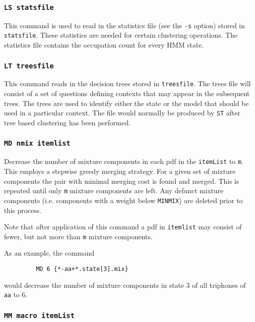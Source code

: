 \subsubsection*{\tt LS statsfile}

This command is used to read in the  statistics file 
(see the  \texttt{-s} option) stored in \texttt{statsfile}.  These
statistics are needed for certain clustering operations.
The statistics file contains the occupation count for every HMM state. 

\subsubsection*{\tt LT treesfile}

This command reads in the decision trees stored in \texttt{treesfile}.
The trees file will consist of a set of questions defining contexts
that may appear in the subsequent trees.  The trees are used to
identify either the state or the model that should be used in
a particular context.  The file would normally be produced by
\texttt{ST} after tree based clustering has been performed.

\subsubsection*{\tt MD nmix itemlist}

Decrease the number of mixture components in each pdf in the
\texttt{itemList} to \texttt{m}. This employs a stepwise greedy
merging strategy. For a given set of mixture components the pair with
minimal merging cost is found and merged. This is repeated until only
\texttt{m} mixture components are left. Any defunct mixture components
(i.e. components with a weight below \texttt{MINMIX}) are deleted
prior to this process.

Note that after application of this command a pdf in {\tt itemlist}
may consist of fewer, but not more than \texttt{m} mixture components.

As an example, the command
\begin{verbatim}
         MD 6 {*-aa+*.state[3].mix}
\end{verbatim}
would decrease the number of mixture components in state 3 of all
triphones of \texttt{aa} to 6.

\subsubsection*{\tt MM macro itemList}

